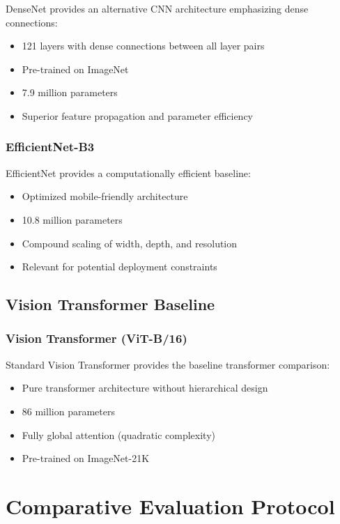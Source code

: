 DenseNet provides an alternative CNN architecture emphasizing dense connections:

\begin{itemize}
    \item 121 layers with dense connections between all layer pairs
    \item Pre-trained on ImageNet
    \item 7.9 million parameters
    \item Superior feature propagation and parameter efficiency
\end{itemize}

\subsubsection{EfficientNet-B3}

EfficientNet provides a computationally efficient baseline:

\begin{itemize}
    \item Optimized mobile-friendly architecture
    \item 10.8 million parameters
    \item Compound scaling of width, depth, and resolution
    \item Relevant for potential deployment constraints
\end{itemize}

\subsection{Vision Transformer Baseline}

\subsubsection{Vision Transformer (ViT-B/16)}

Standard Vision Transformer provides the baseline transformer comparison:

\begin{itemize}
    \item Pure transformer architecture without hierarchical design
    \item 86 million parameters
    \item Fully global attention (quadratic complexity)
    \item Pre-trained on ImageNet-21K
\end{itemize}

\section{Comparative Evaluation Protocol}

